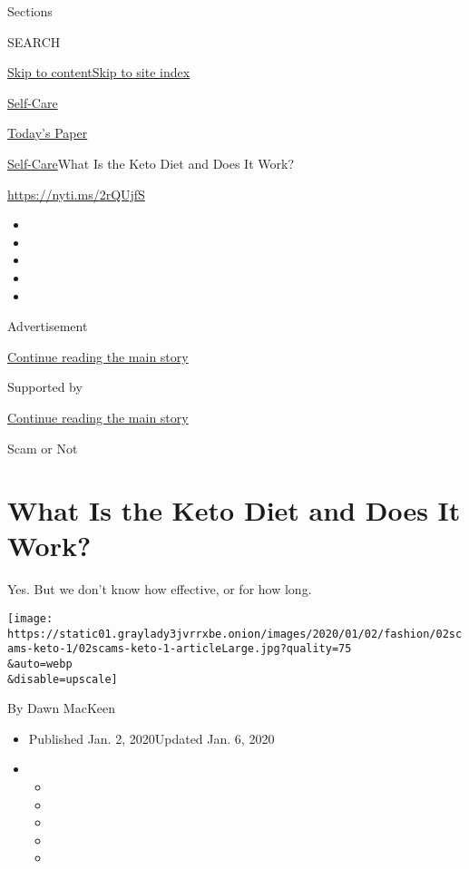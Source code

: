 Sections

SEARCH

\protect\hyperlink{site-content}{Skip to
content}\protect\hyperlink{site-index}{Skip to site index}

\href{https://www.nytimes3xbfgragh.onion/section/style/self-care/}{Self-Care}

\href{https://myaccount.nytimes3xbfgragh.onion/auth/login?response_type=cookie\&client_id=vi}{}

\href{https://www.nytimes3xbfgragh.onion/section/todayspaper}{Today's
Paper}

\href{/section/style/self-care/}{Self-Care}\textbar{}What Is the Keto
Diet and Does It Work?

\href{https://nyti.ms/2rQUjfS}{https://nyti.ms/2rQUjfS}

\begin{itemize}
\item
\item
\item
\item
\item
\end{itemize}

Advertisement

\protect\hyperlink{after-top}{Continue reading the main story}

Supported by

\protect\hyperlink{after-sponsor}{Continue reading the main story}

Scam or Not

\hypertarget{what-is-the-keto-diet-and-does-it-work}{%
\section{What Is the Keto Diet and Does It
Work?}\label{what-is-the-keto-diet-and-does-it-work}}

Yes. But we don't know how effective, or for how long.

\texttt{[image: https://static01.graylady3jvrrxbe.onion/images/2020/01/02/fashion/02scams-keto-1/02scams-keto-1-articleLarge.jpg?quality=75\\\&auto=webp\\\&disable=upscale]}

By Dawn MacKeen

\begin{itemize}
\item
  Published Jan. 2, 2020Updated Jan. 6, 2020
\item
  \begin{itemize}
  \item
  \item
  \item
  \item
  \item
  \end{itemize}
\end{itemize}

